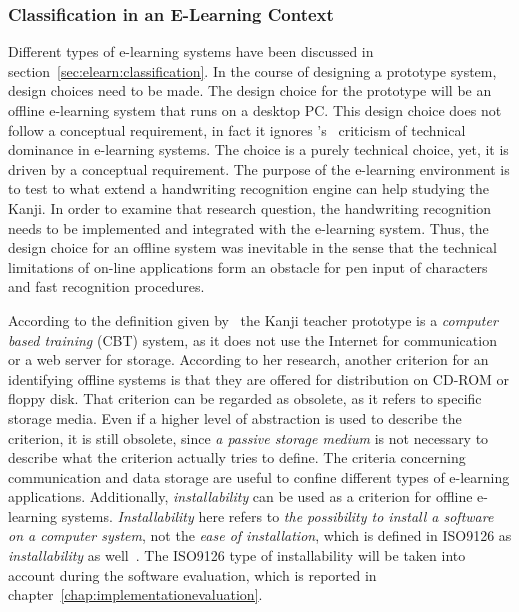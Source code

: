 \subsubsection{Classification in an E-Learning Context}
\label{sec:concept:classificationinelearning}

Different types of e-learning systems have been discussed in 
section~\ref{sec:elearn:classification}. In the course of designing a prototype 
system, design choices need to be made.
The design choice for the prototype will be an offline e-learning system that 
runs on a desktop PC.
This design choice does not follow a conceptual requirement, in fact it ignores
's~\citeyear{Ivashin2009} criticism of technical 
dominance in e-learning systems. The choice is a purely technical choice, 
yet, it is driven by a conceptual requirement.
The purpose of the e-learning environment is to test to what extend a handwriting
recognition engine can help studying the Kanji. In order to examine that 
research question, the handwriting recognition needs to be implemented and 
integrated with the e-learning system. 
Thus, the design choice for an offline system was inevitable in the sense that 
the technical limitations of on-line applications form an obstacle for pen 
input of characters and fast recognition procedures.

According to the definition given by~ the Kanji teacher 
prototype is a \emph{computer based training} (CBT) system, as it does not use 
the Internet for communication or a web server for storage. 
According to her research, another criterion for an identifying offline systems 
is that they are offered for distribution on CD-ROM or floppy disk.
That criterion can be regarded as obsolete, as it refers to specific storage 
media. Even if a higher level of abstraction is used to describe the
criterion, it is still obsolete, since \emph{a passive storage medium} is not 
necessary to describe what the criterion actually tries to define.
The criteria concerning communication and data storage are useful to confine
different types of e-learning applications.
Additionally, \emph{installability} can be used as a criterion for offline 
e-learning systems. \emph{Installability} here refers to 
\emph{the possibility to install a software on a computer system}, 
not the \emph{ease of installation}, 
which is defined in ISO9126 as \emph{installability} as 
well~. 
The ISO9126 type of installability will be taken into account during the software
evaluation, which is reported in chapter~\ref{chap:implementationevaluation}.

